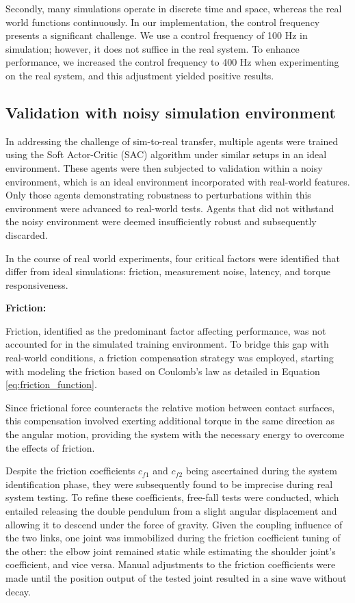 Secondly, many simulations operate in discrete time and space, whereas the real world functions continuously. In our implementation, the control frequency presents a significant challenge. We use a control frequency of 100 Hz in simulation; however, it does not suffice in the real system. To enhance performance, we increased the control frequency to 400 Hz when experimenting on the real system, and this adjustment yielded positive results.

\subsection{Validation with noisy simulation environment}
In addressing the challenge of sim-to-real transfer, multiple agents were trained using the Soft Actor-Critic (SAC) algorithm under similar setups in an ideal environment. These agents were then subjected to validation within a noisy environment, which is an ideal environment incorporated with real-world features. Only those agents demonstrating robustness to perturbations within this environment were advanced to real-world tests. Agents that did not withstand the noisy environment were deemed insufficiently robust and subsequently discarded.

In the course of real world experiments, four critical factors were identified that differ from ideal simulations: friction, measurement noise, latency, and torque responsiveness.

\textbf{Friction:}

Friction, identified as the predominant factor affecting performance, was not accounted for in the simulated training environment. To bridge this gap with real-world conditions, a friction compensation strategy was employed, starting with modeling the friction based on Coulomb’s law as detailed in Equation \ref{eq:friction_function}. 

Since frictional force counteracts the relative motion between contact surfaces, this compensation involved exerting additional torque in the same direction as the angular motion, providing the system with the necessary energy to overcome the effects of friction.

Despite the friction coefficients \(c_{f1}\) and \(c_{f2}\) being ascertained during the system identification phase, they were subsequently found to be imprecise during real system testing. To refine these coefficients, free-fall tests were conducted, which entailed releasing the double pendulum from a slight angular displacement and allowing it to descend under the force of gravity. Given the coupling influence of the two links, one joint was immobilized during the friction coefficient tuning of the other: the elbow joint remained static while estimating the shoulder joint's coefficient, and vice versa. Manual adjustments to the friction coefficients were made until the position output of the tested joint resulted in a sine wave without decay.

